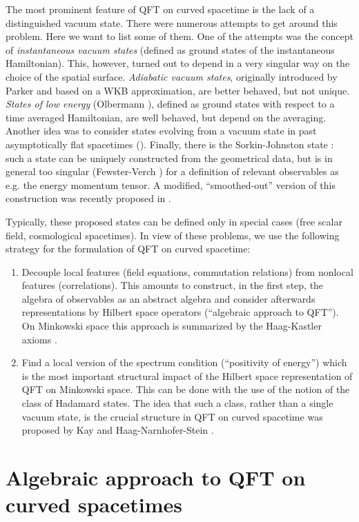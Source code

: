 \documentclass[12pt]{article}
\newcommand{\1}{\mathds{1}}                         %
\begin{document}
The most prominent feature of QFT on curved spacetime is the lack of a distinguished vacuum state. There were numerous attempts to get around this problem. Here we want to list some of them. One of the attempts was the concept of \textit{instantaneous vacuum states} (defined as ground states of the instantaneous Hamiltonian). This, however, turned out to depend in a very singular way on the choice of the spatial surface. \textit{Adiabatic vacuum states}, originally introduced by  Parker \cite{Parker} and based on a WKB approximation, are  better behaved, but not unique. \textit{States of low energy} (Olbermann \cite{Olbermann}), defined as ground states with respect to a time averaged Hamiltonian, are  well behaved, but depend on the averaging. Another idea was to consider states evolving from a vacuum state in past asymptotically flat spacetimes (\cite{DMP09a,DMP09,DMP11,DHP11,DS11,BDM14}). Finally, there is the Sorkin-Johnston state \cite{Johnston,Sorkin,SJ12}: such a state can be uniquely constructed from the geometrical data, but is  in general too singular (Fewster-Verch \cite{FV12}) for a definition of relevant observables as e.g. the energy momentum tensor. A modified, ``smoothed-out'' version of this construction was recently proposed in \cite{BrumF14}.

Typically, these proposed states can be defined only in special cases (free scalar field, cosmological spacetimes). In view of these problems, we use the following strategy for the formulation of QFT on curved spacetime:
\begin{enumerate}
\item Decouple local features (field equations, commutation relations) from nonlocal features (correlations). This amounts to construct, in the first step, the algebra of observables as an abstract algebra and consider afterwards representations by Hilbert space operators (``algebraic approach to QFT''). On Minkowski space this approach is summarized by the Haag-Kastler axioms \cite{HK,Haag}.
\item Find a local version of the spectrum condition (``positivity of energy'') which is the most important structural impact of the Hilbert space representation of QFT on Minkowski space. This can be done with the use of the notion of the class of Hadamard states. The idea that such a class, rather than a single vacuum state, is the crucial structure in QFT on curved spacetime was proposed by Kay \cite{Kay84} and Haag-Narnhofer-Stein  \cite{HNS}.
\end{enumerate}
\section{Algebraic approach to QFT on curved spacetimes}
\end{document}
